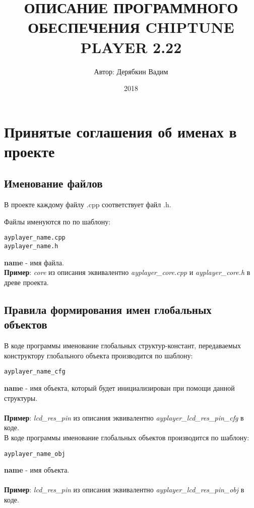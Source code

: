 \documentclass[a4paper, 12pt]{article}
\begin{document}
\title {ОПИСАНИЕ ПРОГРАММНОГО ОБЕСПЕЧЕНИЯ CHIPTUNE PLAYER 2.22}
\author {Автор: Дерябкин Вадим}
\date {2018}
\maketitle
\clearpage

\tableofcontents							%
\clearpage									%

\section{Принятые соглашения об именах в проекте}
\subsection{Именование файлов}
В проекте каждому файлу .cpp соответствует файл .h.

Файлы именуются по по шаблону:
\begin{verbatim}
ayplayer_name.cpp
ayplayer_name.h
\end{verbatim}

\textbf{name} - имя файла.\\

\textbf{Пример}: \textit{core} из описания эквивалентно \textit{ayplayer\_core.cpp} и \textit{ayplayer\_core.h} в древе проекта.

\subsection{Правила формирования имен глобальных объектов}
В коде программы именование глобальных структур-констант, передаваемых конструктору глобального объекта производится по шаблону:
\begin{verbatim}ayplayer_name_cfg\end{verbatim}
\textbf{name} - имя объекта, который будет инициализирован при помощи данной структуры.\\\\
\textbf{Пример}: \textit{lcd\_res\_pin} из описания эквивалентно \textit{ayplayer\_lcd\_res\_pin\_cfg} в коде.\\

В коде программы именование глобальных объектов производится по шаблону:
\begin{verbatim}ayplayer_name_obj\end{verbatim}
\textbf{name} - имя объекта.\\\\
\textbf{Пример}: \textit{lcd\_res\_pin} из описания эквивалентно \textit{ayplayer\_lcd\_res\_pin\_obj} в коде.
\end{document}
